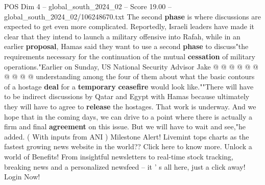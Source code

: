 \begin{textsample}{POS Dim 4 – global\_south\_2024\_02 – Score 19.00 – global\_south\_2024\_02/106248670.txt}
The second \textbf{phase} is where discussions are expected to get even more complicated.
Reportedly, Israeli leaders have made it clear that they intend to launch a military offensive into Rafah, while in an earlier \textbf{proposal}, Hamas said they want to use a second \textbf{phase} to discuss"the requirements necessary for the continuation of the mutual \textbf{cessation} of military operations."Earlier on Sunday, US National Security Advisor Jake @ @ @ @ @ @ @ @ @ @ understanding among the four of them about what the basic contours of a hostage \textbf{deal} for a \textbf{temporary} \textbf{ceasefire} would look like.""There will have to be indirect discussions by Qatar and Egypt with Hamas because ultimately they will have to agree to \textbf{release} the hostages.
That work is underway.
And we hope that in the coming days, we can drive to a point where there is actually a firm and final \textbf{agreement} on this issue.
But we will have to wait and see,"he added. ( With inputs from ANI ) Milestone Alert!
Livemint tops charts as the fastest growing news website in the world??
Click here to know more.
Unlock a world of Benefits!
From insightful newsletters to real-time stock tracking, breaking news and a personalized newsfeed -- it ' s all here, just a click away!
Login Now!

\end{textsample}
